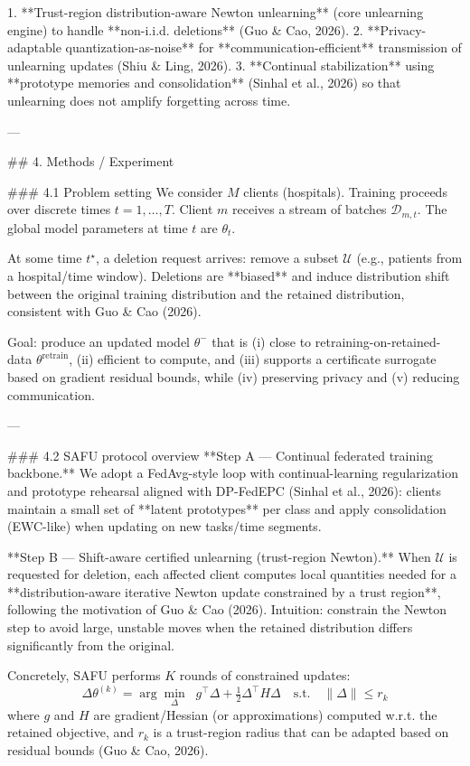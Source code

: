 1. **Trust-region distribution-aware Newton unlearning** (core unlearning engine) to handle **non-i.i.d. deletions** (Guo & Cao, 2026).
2. **Privacy-adaptable quantization-as-noise** for **communication-efficient** transmission of unlearning updates (Shiu & Ling, 2026).
3. **Continual stabilization** using **prototype memories and consolidation** (Sinhal et al., 2026) so that unlearning does not amplify forgetting across time.

---

## 4. Methods / Experiment

### 4.1 Problem setting
We consider \(M\) clients (hospitals). Training proceeds over discrete times \(t=1,\dots,T\). Client \(m\) receives a stream of batches \(\mathcal{D}_{m,t}\). The global model parameters at time \(t\) are \(\theta_t\).

At some time \(t^\star\), a deletion request arrives: remove a subset \(\mathcal{U}\) (e.g., patients from a hospital/time window). Deletions are **biased** and induce distribution shift between the original training distribution and the retained distribution, consistent with Guo & Cao (2026).

Goal: produce an updated model \(\theta^{-}\) that is (i) close to retraining-on-retained-data \(\theta^{\text{retrain}}\), (ii) efficient to compute, and (iii) supports a certificate surrogate based on gradient residual bounds, while (iv) preserving privacy and (v) reducing communication.

---

### 4.2 SAFU protocol overview
**Step A — Continual federated training backbone.**  
We adopt a FedAvg-style loop with continual-learning regularization and prototype rehearsal aligned with DP-FedEPC (Sinhal et al., 2026): clients maintain a small set of **latent prototypes** per class and apply consolidation (EWC-like) when updating on new tasks/time segments.

**Step B — Shift-aware certified unlearning (trust-region Newton).**  
When \(\mathcal{U}\) is requested for deletion, each affected client computes local quantities needed for a **distribution-aware iterative Newton update constrained by a trust region**, following the motivation of Guo & Cao (2026). Intuition: constrain the Newton step to avoid large, unstable moves when the retained distribution differs significantly from the original.

Concretely, SAFU performs \(K\) rounds of constrained updates:
\[
\Delta\theta^{(k)} = \arg\min_{\Delta} \;\; g^\top \Delta + \tfrac{1}{2}\Delta^\top H \Delta \quad \text{s.t.}\quad \|\Delta\|\le r_k
\]
where \(g\) and \(H\) are gradient/Hessian (or approximations) computed w.r.t. the retained objective, and \(r_k\) is a trust-region radius that can be adapted based on residual bounds (Guo & Cao, 2026).


